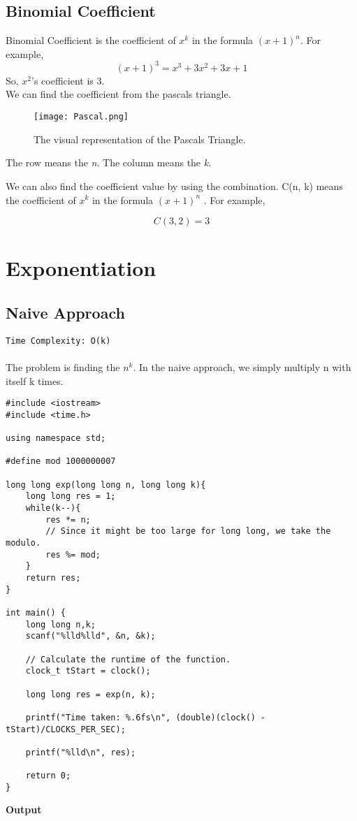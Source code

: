 \documentclass[12pt]{article}
\begin{document}
\subsection{Binomial Coefficient}
Binomial Coefficient is the coefficient of $x^k$ in the formula $(x+1)^n$. For example,
\[ (x+1)^3  = x^3 + 3x^2 + 3x + 1\]
So, $x^2$'s coefficient is 3. \\

We can find the coefficient from the pascals triangle.

\begin{figure}[H]
\centering
\texttt{[image: Pascal.png]}
\caption{The visual representation of the Pascals Triangle.}
\label{fig:pascal}
\end{figure}

The row means the \textit{n}. The column means the \textit{k}.

We can also find the coefficient value by using the combination. C(n, k) means the coefficient of $x^k$ in the formula $(x+1)^n$ \cite{binomialcoefficient}. For example,

\[ C(3, 2) = 3\]

\clearpage

\section{Exponentiation}
\subsection{Naive Approach }
\texttt{Time Complexity: O(k) } \\ \\
The problem is finding the $n^k$. In the naive approach, we simply multiply n with itself k times.

\begin{verbatim}
#include <iostream>
#include <time.h>

using namespace std;

#define mod 1000000007

long long exp(long long n, long long k){
    long long res = 1;
    while(k--){
        res *= n;
        // Since it might be too large for long long, we take the modulo.
        res %= mod;
    }
    return res;
}

int main() {
    long long n,k;
    scanf("%lld%lld", &n, &k);
    
    // Calculate the runtime of the function.
    clock_t tStart = clock();
    
    long long res = exp(n, k);
    
    printf("Time taken: %.6fs\n", (double)(clock() - tStart)/CLOCKS_PER_SEC);
    
    printf("%lld\n", res);
    
    return 0;
}

\end{verbatim}
\textbf{Output}
\end{document}
